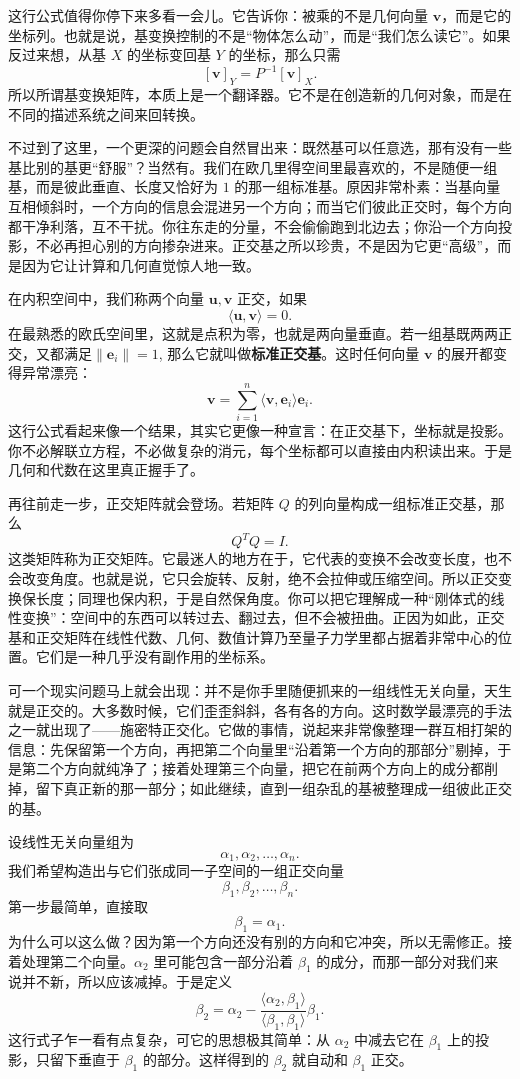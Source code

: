 \documentclass[UTF8]{ctexbook}
\begin{document}
这行公式值得你停下来多看一会儿。它告诉你：被乘的不是几何向量 $\mathbf{v}$，而是它的坐标列。也就是说，基变换控制的不是“物体怎么动”，而是“我们怎么读它”。如果反过来想，从基 $X$ 的坐标变回基 $Y$ 的坐标，那么只需
\[
[\mathbf{v}]_Y=P^{-1}[\mathbf{v}]_X.
\]
所以所谓基变换矩阵，本质上是一个翻译器。它不是在创造新的几何对象，而是在不同的描述系统之间来回转换。

不过到了这里，一个更深的问题会自然冒出来：既然基可以任意选，那有没有一些基比别的基更“舒服”？当然有。我们在欧几里得空间里最喜欢的，不是随便一组基，而是彼此垂直、长度又恰好为 $1$ 的那一组标准基。原因非常朴素：当基向量互相倾斜时，一个方向的信息会混进另一个方向；而当它们彼此正交时，每个方向都干净利落，互不干扰。你往东走的分量，不会偷偷跑到北边去；你沿一个方向投影，不必再担心别的方向掺杂进来。正交基之所以珍贵，不是因为它更“高级”，而是因为它让计算和几何直觉惊人地一致。

在内积空间中，我们称两个向量 $\mathbf{u},\mathbf{v}$ 正交，如果
\[
\langle \mathbf{u},\mathbf{v}\rangle =0.
\]
在最熟悉的欧氏空间里，这就是点积为零，也就是两向量垂直。若一组基既两两正交，又都满足$\|\mathbf{e}_i\|=1$,
那么它就叫做\textbf{标准正交基}。这时任何向量 $\mathbf{v}$ 的展开都变得异常漂亮：
\[
\mathbf{v}=\sum_{i=1}^{n}\langle \mathbf{v},\mathbf{e}_i\rangle \mathbf{e}_i.
\]
这行公式看起来像一个结果，其实它更像一种宣言：在正交基下，坐标就是投影。你不必解联立方程，不必做复杂的消元，每个坐标都可以直接由内积读出来。于是几何和代数在这里真正握手了。

再往前走一步，正交矩阵就会登场。若矩阵 $Q$ 的列向量构成一组标准正交基，那么
\[
Q^TQ=I.
\]
这类矩阵称为正交矩阵。它最迷人的地方在于，它代表的变换不会改变长度，也不会改变角度。也就是说，它只会旋转、反射，绝不会拉伸或压缩空间。所以正交变换保长度；同理也保内积，于是自然保角度。你可以把它理解成一种“刚体式的线性变换”：空间中的东西可以转过去、翻过去，但不会被扭曲。正因为如此，正交基和正交矩阵在线性代数、几何、数值计算乃至量子力学里都占据着非常中心的位置。它们是一种几乎没有副作用的坐标系。

可一个现实问题马上就会出现：并不是你手里随便抓来的一组线性无关向量，天生就是正交的。大多数时候，它们歪歪斜斜，各有各的方向。这时数学最漂亮的手法之一就出现了——施密特正交化。它做的事情，说起来非常像整理一群互相打架的信息：先保留第一个方向，再把第二个向量里“沿着第一个方向的那部分”剔掉，于是第二个方向就纯净了；接着处理第三个向量，把它在前两个方向上的成分都削掉，留下真正新的那一部分；如此继续，直到一组杂乱的基被整理成一组彼此正交的基。

设线性无关向量组为
\[
\alpha_1,\alpha_2,\dots,\alpha_n.
\]
我们希望构造出与它们张成同一子空间的一组正交向量
\[
\beta_1,\beta_2,\dots,\beta_n.
\]
第一步最简单，直接取
\[
\beta_1=\alpha_1.
\]
为什么可以这么做？因为第一个方向还没有别的方向和它冲突，所以无需修正。接着处理第二个向量。$\alpha_2$ 里可能包含一部分沿着 $\beta_1$ 的成分，而那一部分对我们来说并不新，所以应该减掉。于是定义
\[
\beta_2=\alpha_2-
\frac{\langle \alpha_2,\beta_1\rangle}{\langle \beta_1,\beta_1\rangle}\beta_1.
\]
这行式子乍一看有点复杂，可它的思想极其简单：从 $\alpha_2$ 中减去它在 $\beta_1$ 上的投影，只留下垂直于 $\beta_1$ 的部分。这样得到的 $\beta_2$ 就自动和 $\beta_1$ 正交。
\end{document}
